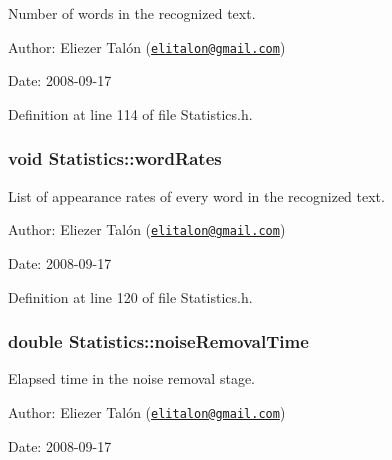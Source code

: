 Number of words in the recognized text. 

\begin{Desc}
\item[Author:]Eliezer Talón (\href{mailto:elitalon@gmail.com}{\tt elitalon@gmail.com}) \end{Desc}
\begin{Desc}
\item[Date:]2008-09-17 \end{Desc}


Definition at line 114 of file Statistics.h.\hypertarget{class_statistics_f656c644cb43977450422c215b2130c6}{
\subsubsection[wordRates]{\setlength{\rightskip}{0pt plus 5cm}void {\bf Statistics::wordRates}}}
\label{class_statistics_f656c644cb43977450422c215b2130c6}


List of appearance rates of every word in the recognized text. 

\begin{Desc}
\item[Author:]Eliezer Talón (\href{mailto:elitalon@gmail.com}{\tt elitalon@gmail.com}) \end{Desc}
\begin{Desc}
\item[Date:]2008-09-17 \end{Desc}


Definition at line 120 of file Statistics.h.\hypertarget{class_statistics_4a194feb4de2fc619d311b2adb2a7e74}{
\subsubsection[noiseRemovalTime]{\setlength{\rightskip}{0pt plus 5cm}double {\bf Statistics::noiseRemovalTime}}}
\label{class_statistics_4a194feb4de2fc619d311b2adb2a7e74}


Elapsed time in the noise removal stage. 

\begin{Desc}
\item[Author:]Eliezer Talón (\href{mailto:elitalon@gmail.com}{\tt elitalon@gmail.com}) \end{Desc}
\begin{Desc}
\item[Date:]2008-09-17 \end{Desc}


